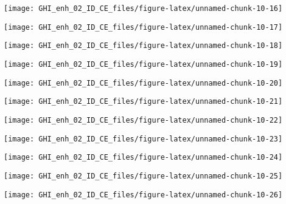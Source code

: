 \documentclass[
  10pt,
  a4paper,oneside]{article}
\begin{document}
\begin{center}\texttt{[image: GHI\_enh\_02\_ID\_CE\_files/figure-latex/unnamed-chunk-10-16]} \end{center}

\begin{center}\texttt{[image: GHI\_enh\_02\_ID\_CE\_files/figure-latex/unnamed-chunk-10-17]} \end{center}

\begin{center}\texttt{[image: GHI\_enh\_02\_ID\_CE\_files/figure-latex/unnamed-chunk-10-18]} \end{center}

\begin{center}\texttt{[image: GHI\_enh\_02\_ID\_CE\_files/figure-latex/unnamed-chunk-10-19]} \end{center}

\begin{center}\texttt{[image: GHI\_enh\_02\_ID\_CE\_files/figure-latex/unnamed-chunk-10-20]} \end{center}

\begin{center}\texttt{[image: GHI\_enh\_02\_ID\_CE\_files/figure-latex/unnamed-chunk-10-21]} \end{center}

\begin{center}\texttt{[image: GHI\_enh\_02\_ID\_CE\_files/figure-latex/unnamed-chunk-10-22]} \end{center}

\begin{center}\texttt{[image: GHI\_enh\_02\_ID\_CE\_files/figure-latex/unnamed-chunk-10-23]} \end{center}

\begin{center}\texttt{[image: GHI\_enh\_02\_ID\_CE\_files/figure-latex/unnamed-chunk-10-24]} \end{center}

\begin{center}\texttt{[image: GHI\_enh\_02\_ID\_CE\_files/figure-latex/unnamed-chunk-10-25]} \end{center}

\begin{center}\texttt{[image: GHI\_enh\_02\_ID\_CE\_files/figure-latex/unnamed-chunk-10-26]} \end{center}
\end{document}
